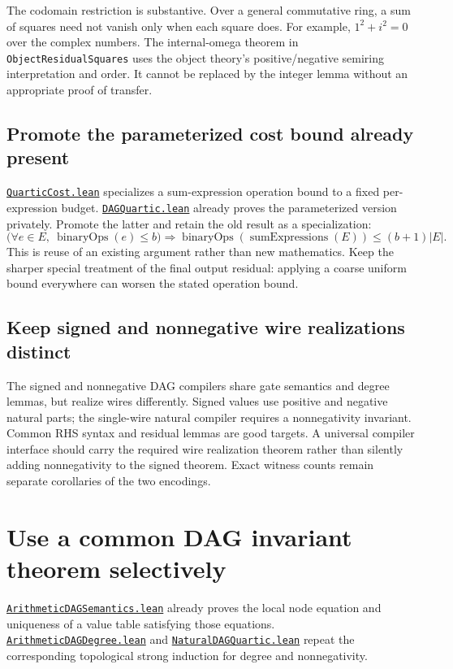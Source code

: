 \documentclass[11pt,letterpaper]{article}
\newcommand{\code}[1]{\nolinkurl{#1}}
\newcommand{\src}[2]{\href{https://github.com/VladimirReshetnikov/ProveIt/blob/60e9c5d620c6c387d932876cfa2d9376f64ea56c/Computability/DiophantineConsistency/Lean/DiophantineConsistency/#1.lean}{\code{#1.lean}}#2}
\begin{document}
The codomain restriction is substantive. Over a general commutative ring,
a sum of squares need not vanish only when each square does. For example,
$1^2+i^2=0$ over the complex numbers. The internal-omega theorem in
\code{ObjectResidualSquares} uses the object theory's positive/negative
semiring interpretation and order. It cannot be replaced by the integer
lemma without an appropriate proof of transfer.

\subsection{Promote the parameterized cost bound already present}

\src{QuarticCost}{ specializes a sum-expression operation bound to a fixed
per-expression budget.}
\src{DAGQuartic}{ already proves the parameterized version privately.}
Promote the latter and retain the old result as a specialization:
\[
 \bigl(\forall e\in E,\ \operatorname{binaryOps}(e)\le b\bigr)
 \Longrightarrow
 \operatorname{binaryOps}(\operatorname{sumExpressions}(E))
 \le (b+1)|E|.
\]
This is reuse of an existing argument rather than new mathematics.
Keep the sharper special treatment of the final output residual: applying
a coarse uniform bound everywhere can worsen the stated operation bound.

\subsection{Keep signed and nonnegative wire realizations distinct}

The signed and nonnegative DAG compilers share gate semantics and degree
lemmas, but realize wires differently. Signed values use positive and negative
natural parts; the single-wire natural compiler requires a nonnegativity
invariant. Common RHS syntax and residual lemmas are good targets. A universal
compiler interface should carry the required wire realization theorem rather
than silently adding nonnegativity to the signed theorem. Exact witness counts
remain separate corollaries of the two encodings.

\section{Use a common DAG invariant theorem selectively}

\src{ArithmeticDAGSemantics}{ already proves the local node equation and
uniqueness of a value table satisfying those equations.}
\src{ArithmeticDAGDegree}{ and }
\src{NaturalDAGQuartic}{ repeat the corresponding topological strong induction
for degree and nonnegativity.}
\end{document}
